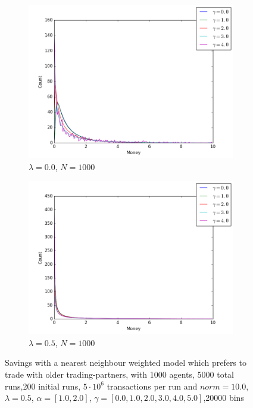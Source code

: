 \documentclass[a4paper,11pt]{article}
\begin{document}
{\begin{figure}[H]
	\centering
	\begin{subfigure}[t]{0.45\textwidth}
		\includegraphics[scale=0.4]{historic_lambda=0_5_alpha=1}
		\caption{$\lambda = 0.0$, $N=1000$}
		\label{fig:historic_lambda=0_5_alpha=1}
	\end{subfigure}
	\begin{subfigure}[t]{0.45\textwidth}
		\includegraphics[scale=0.4]{historic_lambda=0_5_alpha=2}
		\caption{$\lambda = 0.5$, $N=1000$}
		\label{fig:historic_lambda=0_5_alpha=2}
	\end{subfigure}
	\caption{Savings with a nearest neighbour weighted model which prefers to trade with older trading-partners, with 1000 agents, 5000 total runs,200 initial runs,  $5\cdot 10^{6}$ transactions per run and  $norm=10.0$,$\lambda=0.5$, $\alpha=[1.0,2.0]$, $\gamma=[0.0,1.0,2.0,3.0,4.0,5.0]$,20000 bins}
	\label{fig:history_lambda=0_5}
\end{figure}


}
\end{document}
